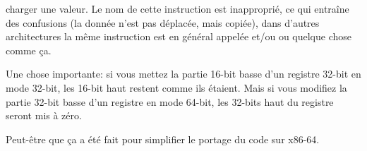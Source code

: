 \item[MOV] charger une valeur.
Le nom de cette instruction est inapproprié, ce qui entraîne des confusions (la donnée
n'est pas déplacée, mais copiée), dans d'autres architectures la même instruction
est en général appelée  et/ou  ou quelque chose comme ça.

Une chose importante: si vous mettez la partie 16-bit basse d'un registre 32-bit
en mode 32-bit, les 16-bit haut restent comme ils étaient.
Mais si vous modifiez la partie 32-bit basse d'un registre en mode 64-bit, les 32-bits
haut du registre seront mis à zéro.

Peut-être que ça a été fait pour simplifier le portage du code sur x86-64.

